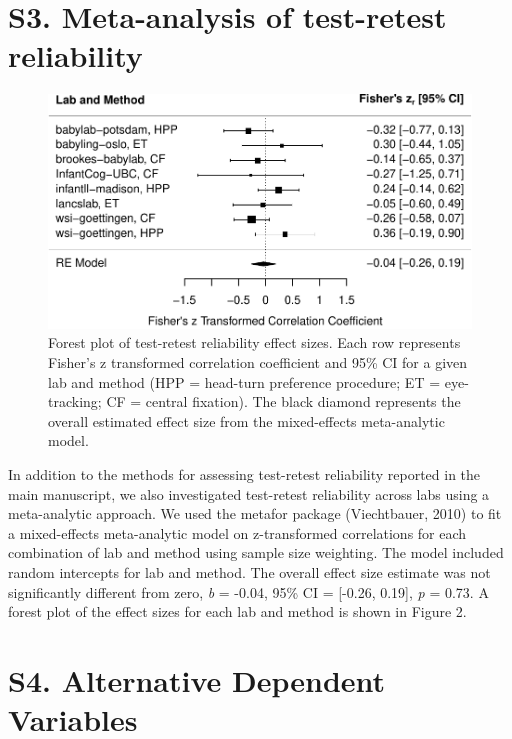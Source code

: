 \documentclass[
  man, donotrepeattitle,floatsintext]{apa6}
\begin{document}
\newpage

\hypertarget{s3.-meta-analysis-of-test-retest-reliability}{%
\section{S3. Meta-analysis of test-retest reliability}\label{s3.-meta-analysis-of-test-retest-reliability}}

\begin{figure}
\centering
\includegraphics{MB1T_supplement_files/figure-latex/fig2-1.pdf}
\caption{\label{fig:fig2}Forest plot of test-retest reliability effect sizes. Each row represents Fisher's z transformed correlation coefficient and 95\% CI for a given lab and method (HPP = head-turn preference procedure; ET = eye-tracking; CF = central fixation). The black diamond represents the overall estimated effect size from the mixed-effects meta-analytic model.}
\end{figure}

In addition to the methods for assessing test-retest reliability reported in the main manuscript, we also investigated test-retest reliability across labs using a meta-analytic approach.
We used the metafor package (Viechtbauer, 2010) to fit a mixed-effects meta-analytic model on z-transformed correlations for each combination of lab and method using sample size weighting.
The model included random intercepts for lab and method.
The overall effect size estimate was not significantly different from zero, \emph{b} = -0.04, 95\% CI = {[}-0.26, 0.19{]}, \emph{p} = 0.73.
A forest plot of the effect sizes for each lab and method is shown in Figure 2.

\newpage

\hypertarget{s4.-alternative-dependent-variables}{%
\section{S4. Alternative Dependent Variables}\label{s4.-alternative-dependent-variables}}
\end{document}
